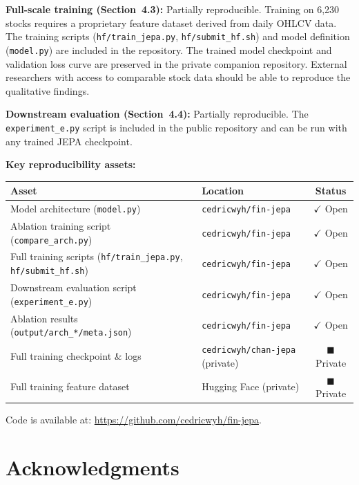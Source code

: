\documentclass[11pt]{article}
\begin{document}
\textbf{Full-scale training (Section~4.3):} Partially reproducible. Training on 6,230 stocks requires a proprietary feature dataset derived from daily OHLCV data. The training scripts (\texttt{hf/train\_jepa.py}, \texttt{hf/submit\_hf.sh}) and model definition (\texttt{model.py}) are included in the repository. The trained model checkpoint and validation loss curve are preserved in the private companion repository. External researchers with access to comparable stock data should be able to reproduce the qualitative findings.

\textbf{Downstream evaluation (Section~4.4):} Partially reproducible. The \texttt{experiment\_e.py} script is included in the public repository and can be run with any trained JEPA checkpoint.

\textbf{Key reproducibility assets:}

\begin{center}
\begin{tabular}{llc}
\toprule
Asset & Location & Status \\
\midrule
Model architecture (\texttt{model.py}) & \texttt{cedricwyh/fin-jepa} & $\checkmark$ Open \\
Ablation training script (\texttt{compare\_arch.py}) & \texttt{cedricwyh/fin-jepa} & $\checkmark$ Open \\
Full training scripts (\texttt{hf/train\_jepa.py}, \texttt{hf/submit\_hf.sh}) & \texttt{cedricwyh/fin-jepa} & $\checkmark$ Open \\
Downstream evaluation script (\texttt{experiment\_e.py}) & \texttt{cedricwyh/fin-jepa} & $\checkmark$ Open \\
Ablation results (\texttt{output/arch\_*/meta.json}) & \texttt{cedricwyh/fin-jepa} & $\checkmark$ Open \\
Full training checkpoint \& logs & \texttt{cedricwyh/chan-jepa} (private) & $\blacksquare$ Private \\
Full training feature dataset & Hugging Face (private) & $\blacksquare$ Private \\
\bottomrule
\end{tabular}
\end{center}

Code is available at: \url{https://github.com/cedricwyh/fin-jepa}.

\section*{Acknowledgments}
\end{document}

